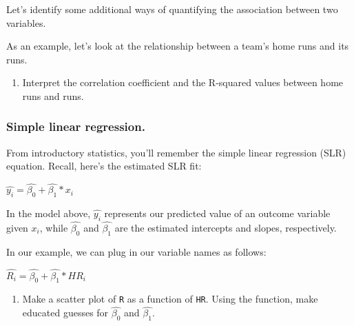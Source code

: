 \documentclass[]{article}
\newenvironment{Shaded}{\begin{snugshade}}{\end{snugshade}}
\newcommand{\DataTypeTok}[1]{\textcolor[rgb]{0.13,0.29,0.53}{#1}}
\newcommand{\DecValTok}[1]{\textcolor[rgb]{0.00,0.00,0.81}{#1}}
\newcommand{\KeywordTok}[1]{\textcolor[rgb]{0.13,0.29,0.53}{\textbf{#1}}}
\newcommand{\NormalTok}[1]{#1}
\newcommand{\OperatorTok}[1]{\textcolor[rgb]{0.81,0.36,0.00}{\textbf{#1}}}
\newcommand{\StringTok}[1]{\textcolor[rgb]{0.31,0.60,0.02}{#1}}
\providecommand{\tightlist}{%
  \setlength{\itemsep}{0pt}\setlength{\parskip}{0pt}}
\begin{document}
Let's identify some additional ways of quantifying the association
between two variables.

As an example, let's look at the relationship between a team's home runs
and its runs.

\begin{Shaded}
\end{Shaded}

\begin{enumerate}
\def\labelenumi{\arabic{enumi}.}
\setcounter{enumi}{3}
\tightlist
\item
  Interpret the correlation coefficient and the R-squared values between
  home runs and runs.
\end{enumerate}

\hypertarget{simple-linear-regression.}{%
\subsubsection{Simple linear
regression.}\label{simple-linear-regression.}}

From introductory statistics, you'll remember the simple linear
regression (SLR) equation. Recall, here's the estimated SLR fit:

\begin{center} $\hat{y_i} = \hat{\beta_0} + \hat{\beta_1}*x_i$ \end{center}

In the model above, \(\hat{y_i}\) represents our predicted value of an
outcome variable given \(x_i\), while \(\hat{\beta_0}\) and
\(\hat{\beta_1}\) are the estimated intercepts and slopes, respectively.

In our example, we can plug in our variable names as follows:

\begin{center} $\hat{R_i} = \hat{\beta_0} + \hat{\beta_1}*HR_i$ \end{center}

\begin{enumerate}
\def\labelenumi{\arabic{enumi}.}
\setcounter{enumi}{4}
\tightlist
\item
  Make a scatter plot of \texttt{R} as a function of \texttt{HR}. Using
  the function, make educated guesses for \(\hat{\beta_0}\) and
  \(\hat{\beta_1}\).
\end{enumerate}
\end{document}
